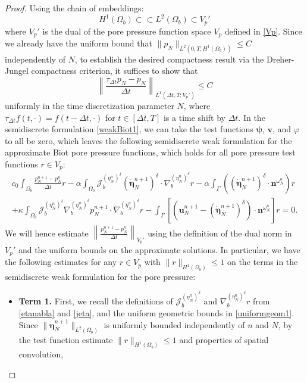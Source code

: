 \documentclass[10pt,a4paper]{amsart}
\newcommand{\bd}{\boldsymbol}
\begin{document}
\begin{proof}
Using the chain of embeddings:
\begin{equation*}
H^{1}(\Omega_{b}) \subset \subset L^{2}(\Omega_{b}) \subset V_{p}'
\end{equation*}
where $V_{p}'$ is the dual of the pore pressure function space $V_{p}$ defined in \eqref{Vp}. Since we already have the uniform bound that $\|p_{N}\|_{L^{2}(0, T; H^{1}(\Omega_{b}))} \le C$ independently of $N$, to establish the desired compactness result via the Dreher-Jungel compactness criterion, it suffices to show that
\begin{equation*}
\left\|\frac{\tau_{\Delta t} p_{N} - p_{N}}{\Delta t}\right\|_{L^{1}(\Delta t, T; V_{p}')} \le C
\end{equation*}
uniformly in the time discretization parameter $N$, where $\tau_{\Delta t}f(t, \cdot) = f(t - \Delta t, \cdot)$ for $t \in [\Delta t, T]$ is a time shift by $\Delta t$. In the semidiscrete formulation \eqref{weakBiot1}, we can take the test functions $\bd{\psi}$, $\bd{v}$, and $\varphi$ to all be zero, which leaves the following semidiscrete weak formulation for the approximate Biot pore pressure functions, which holds for all pore pressure test functions $r \in V_{p}$:
\begin{multline*}
c_{0} \int_{\Omega_{b}} \frac{p^{n + 1}_{N} - p^{n}_{N}}{\Delta t} r - \alpha \int_{\Omega_{b}} \mathcal{J}^{(\eta^{n}_{N})^{\delta}}_{b} (\dot{\bd{\eta}}^{n + 1}_{N})^{\delta} \cdot \nabla^{(\eta^{n}_{N})^{\delta}}_{b} r - \alpha \int_{\Gamma} \left(\left(\dot{\bd{\eta}}^{n + 1}_{N}\right)^{\delta} \cdot \bd{n}^{\omega^{n}_{N}}\right) r \\
+ \kappa \int_{\Omega_{b}} \mathcal{J}^{(\eta^{n}_{N})^{\delta}}_{b} \nabla^{(\eta^{n}_{N})^{\delta}}_{b} p^{n + 1}_{N} \cdot \nabla^{(\eta^{n}_{N})^{\delta}}_{b} r - \int_{\Gamma} \left[\left(\bd{u}^{n + 1}_{N} - (\dot{\bd{\eta}}^{n + 1}_{N})^{\delta}\right) \cdot \bd{n}^{\omega^{n}_{N}}\right] r = 0.
\end{multline*}
We will hence estimate $\displaystyle \left\|\frac{p^{n + 1}_{N} - p^{n}_{N}}{\Delta t}\right\|_{V_{p}'}$ using the definition of the dual norm in $V_{p}'$ and the uniform bounds on the approximate solutions. In particular, we have the following estimates for any $r \in V_{p}$ with $\|r\|_{H^{1}(\Omega_{b})} \le 1$ on the terms in the semidiscrete weak formulation for the pore pressure:
\begin{itemize}
\item \textbf{Term 1.} First, we recall the definitions of $\mathcal{J}^{(\eta^{n}_{N})^{\delta}}_{b}$ and $\nabla^{(\eta^{n}_{N})^{\delta}}_{b} r$ from \eqref{etanabla} and \eqref{jeta}, and the uniform geometric bounds in \eqref{uniformgeom1}. Since $\|\dot{\bd{\eta}}^{n + 1}_{N}\|_{L^{2}(\Omega_{b})}$ is uniformly bounded independently of $n$ and $N$, by the test function estimate $\|r\|_{H^{1}(\Omega_{b})} \le 1$ and properties of spatial convolution,

\end{itemize}
\end{proof}
\end{document}
